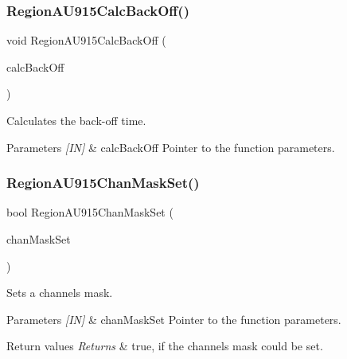 \subsubsection{\texorpdfstring{Region\+A\+U915\+Calc\+Back\+Off()}{RegionAU915CalcBackOff()}}
{\footnotesize\ttfamily void Region\+A\+U915\+Calc\+Back\+Off (\begin{DoxyParamCaption}\item[{\hyperlink{group__REGION_ga7c5c9a8da174e6679eded8257dc92fd9}{Calc\+Back\+Off\+Params\+\_\+t} $\ast$}]{calc\+Back\+Off }\end{DoxyParamCaption})}



Calculates the back-\/off time. 


\begin{DoxyParams}{Parameters}
{\em \mbox{[}\+I\+N\mbox{]}} & calc\+Back\+Off Pointer to the function parameters. \\
\hline
\end{DoxyParams}
\mbox{\label{group__REGIONAU915_gaa3219b953ef291e813856e391ec6f494}} 
\subsubsection{\texorpdfstring{Region\+A\+U915\+Chan\+Mask\+Set()}{RegionAU915ChanMaskSet()}}
{\footnotesize\ttfamily bool Region\+A\+U915\+Chan\+Mask\+Set (\begin{DoxyParamCaption}\item[{\hyperlink{group__REGION_ga6d24f7da136006410827dfb29f6b9b9e}{Chan\+Mask\+Set\+Params\+\_\+t} $\ast$}]{chan\+Mask\+Set }\end{DoxyParamCaption})}



Sets a channels mask. 


\begin{DoxyParams}{Parameters}
{\em \mbox{[}\+I\+N\mbox{]}} & chan\+Mask\+Set Pointer to the function parameters.\\
\hline
\end{DoxyParams}

\begin{DoxyRetVals}{Return values}
{\em Returns} & true, if the channels mask could be set. \\
\hline
\end{DoxyRetVals}
\mbox{\label{group__REGIONAU915_ga1065da4a50172d3af558c7bacc28ad10}} 
